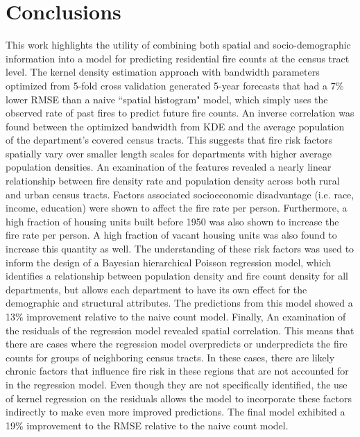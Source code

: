 \documentclass{svjour3}
\begin{document}
  \section{Conclusions}
  This work highlights the utility of combining both spatial and socio-demographic information into a model for predicting residential fire counts at the census tract level. The kernel density estimation approach with bandwidth parameters optimized from 5-fold cross validation generated 5-year forecasts that had a 7\% lower RMSE than a naive ``spatial histogram" model, which simply uses the observed rate of past fires to predict future fire counts. An inverse correlation was found between the optimized bandwidth from KDE and the average population of the department's covered census tracts. This suggests that fire risk factors spatially vary over smaller length scales for departments with higher average population densities. An examination of the features revealed a nearly linear relationship between fire density rate and population density across both rural and urban census tracts. Factors associated socioeconomic disadvantage (i.e. race, income, education) were shown to affect the fire rate per person. Furthermore, a high fraction of housing units built before 1950 was also shown to increase the fire rate per person. A high fraction of vacant housing units was also found to increase this quantity as well. The understanding of these risk factors was used to inform the design of a Bayesian hierarchical Poisson regression model, which identifies a relationship between population density and fire count density for all departments, but allows each department to have its own effect for the demographic and structural attributes. The predictions from this model showed a 13\% improvement relative to the naive count model. Finally, An examination of the residuals of the regression model revealed spatial correlation. This means that there are cases where the regression model overpredicts or underpredicts the fire counts for groups of neighboring census tracts. In these cases, there are likely chronic factors that influence fire risk in these regions that are not accounted for in the regression model. Even though they are not specifically identified, the use of kernel regression on the residuals allows the model to incorporate these factors indirectly to make even more improved predictions. The final model exhibited a 19\% improvement to the RMSE relative to the naive count model. 

  
 \appendix
 
\end{document}
